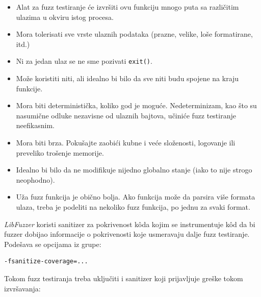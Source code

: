 \begin{itemize}
\item
  Alat za fuzz testiranje će izvršiti ovu funkciju mnogo puta sa različitim ulazima u okviru istog procesa.
\item
  Mora tolerisati sve vrste ulaznih podataka (prazne, velike, loše formatirane, itd.)
\item
  Ni za jedan ulaz se ne sme pozivati \texttt{exit()}.
\item
  Može koristiti niti, ali idealno bi bilo da sve niti budu spojene na kraju funkcije.
\item
  Mora biti deterministička, koliko god je moguće. Nedeterminizam, kao što su nasumične odluke nezavisne od ulaznih bajtova, učiniće fuzz testiranje neefikasnim.
\item
  Mora biti brza. Pokušajte zaobići kubne i veće složenosti, logovanje ili preveliko trošenje memorije.
\item
  Idealno bi bilo da ne modifikuje nijedno globalno stanje (iako to nije strogo neophodno).
\item
  Uža fuzz funkcija je obično bolja. Ako funkcija može da parsira više formata ulaza, treba je podeliti na nekoliko fuzz funkcija, po jednu za svaki format.
\end{itemize}

\emph{LibFuzzer} koristi sanitizer za pokrivenost kôda kojim se instrumentuje kôd da bi fuzzer dobijao informacije o pokrivenosti koje usmeravaju dalje fuzz testiranje. Podešava se opcijama iz grupe:

\begin{verbatim}
-fsanitize-coverage=...
\end{verbatim}

Tokom fuzz testiranja treba uključiti i sanitizer koji prijavljuje greške tokom izvršavanja:

